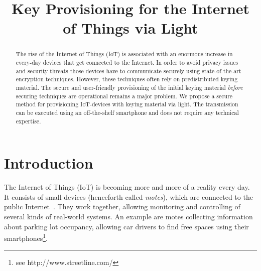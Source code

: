 \documentclass{ewsn-proc} %
\begin{document}
\title{Key Provisioning for the Internet of Things via Light}


\toappear{}
\maketitle

\begin{abstract}
The rise of the Internet of Things (IoT) is associated with an enormous increase in every-day devices that get connected to the Internet.
In order to avoid privacy issues and security threats those devices have to communicate securely using state-of-the-art encryption techniques.
However, these techniques often rely on predistributed keying material.
The secure and user-friendly provisioning of the initial keying material \textit{before} securing techniques are operational remains a major problem.
We propose a secure method for provisioning IoT-devices with keying material via light.
The transmission can be executed using an off-the-shelf smartphone and does not require any technical expertise.
\end{abstract}



\section{Introduction}
\label{sec:introduction}

The Internet of Things (IoT) is becoming more and more of a reality every day.
It consists of small devices (henceforth called \textit{motes}), which are connected to the public Internet~\cite{atzori2010internet}.
They work together, allowing monitoring and controlling of several kinds of real-world systems.
An example are motes collecting information about parking lot occupancy, allowing car drivers to find free spaces using their smartphones\footnote{see http://www.streetline.com/}.
\end{document}
